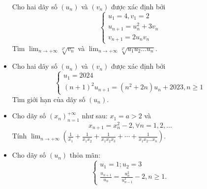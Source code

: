 \documentclass[11pt]{scrartcl}
\begin{document}
\begin{itemize}[label=, leftmargin=0em, itemsep=-0em]
\begin{btvn}
        Cho hai dãy số $(u_n)$ và $(v_n)$ được xác định bởi
        \[
            \left\{
                \begin{array}{l}
                    u_1 = 4, v_1 = 2\\
                    u_{n + 1} = u_n^2 + 3v_n\\
                    v_{n + 1} =2u_nv_n
                \end{array}
            \right.
        \]
        Tìm $\displaystyle \lim_{n \to +\infty}\sqrt[2^n]{v_n}$ và $\displaystyle \lim_{n \to +\infty}\sqrt[2^n]{u_1u_2\dots u_n}$.
    \end{btvn}
    \item \begin{btvn}
        Cho hai dãy số $(u_n)$ và $(v_n)$ được xác định bởi
        \[
            \left\{
                \begin{array}{l}
                    u_1 = 2024\\
                    (n + 1)^2u_{n + 1} =(n^2 + 2n)u_n + 2023, n \geq 1
                \end{array}
            \right.
        \]
        Tìm giới hạn của dãy số $(u_n)$.
    \end{btvn}
    \item \begin{btvn}
        Cho dãy số $\left(x_n\right)_{n=1}^{+\infty}$ như sau: $x_1=a>2$ và
            $$
            x_{n+1}=x_n^2-2, \forall n=1,2, \ldots
            $$
            Tính $\displaystyle\lim _{n \rightarrow+\infty}\left(\frac{1}{x_1}+\frac{1}{x_1 x_2}+\frac{1}{x_1 x_2 x_3}+\cdots+\frac{1}{x_1 x_2 \ldots x_n}\right)$.
    \end{btvn}
    \item \begin{btvn}
        Cho dãy số $\left(u_n\right)$ thỏa mãn:
        $$
        \left\{\begin{array}{l}
        u_1=1 ; u_2=3 \\
        \frac{u_{n+1}}{u_n}=\frac{u_n^2}{u_{n-1}^2}-2, n \geq 1 .
        \end{array}\right.
        $$


\end{btvn}
\end{itemize}
\end{document}

